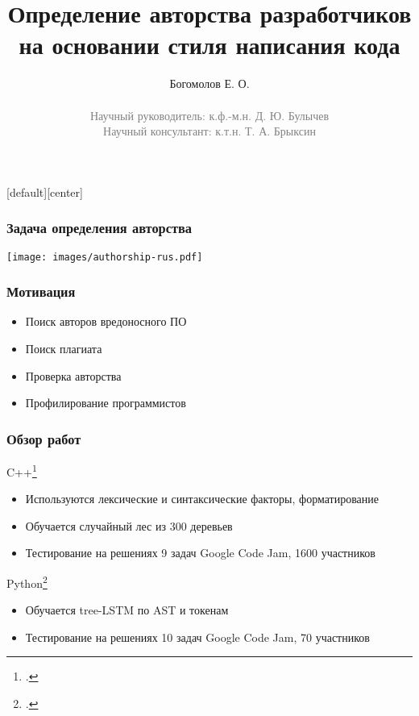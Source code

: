 \documentclass[xcolor=table]{beamer}
\begin{document}
\title[Определение авторства разработчиков]{Определение авторства разработчиков на основании стиля написания кода}
\author[Богомолов Е. О.]{Богомолов Е. О.\\~\\{\footnotesize\textcolor{gray}{Научный руководитель: к.ф.-м.н. Д. Ю. Булычев\\Научный консультант: к.т.н. Т. А. Брыксин}}}
\frame{\titlepage}

[default][center]

\begin{frame}
	\frametitle{Задача определения авторства}
	\begin{center}
		\texttt{[image: images/authorship-rus.pdf]}
	\end{center}
\end{frame}

\begin{frame}
	\frametitle{Мотивация}
	\Large
	\begin{itemize}
		\item Поиск авторов вредоносного ПО
		\item Поиск плагиата
		\item Проверка авторства
		\item Профилирование программистов
	\end{itemize}
\end{frame}

\begin{frame}
	\frametitle{Обзор работ}
	C++\footcite{caliskan2015}
	\begin{itemize}
		\item Используются лексические и синтаксические факторы, форматирование
		\item Обучается случайный лес из 300 деревьев
		\item Тестирование на решениях 9 задач Google Code Jam, 1600 участников
	\end{itemize}

	Python\footcite{alsulami2017}
	\begin{itemize}
		\item Обучается tree-LSTM по AST и токенам
		\item Тестирование на решениях 10 задач Google Code Jam, 70 участников
	\end{itemize}
\end{frame}
\end{document}
